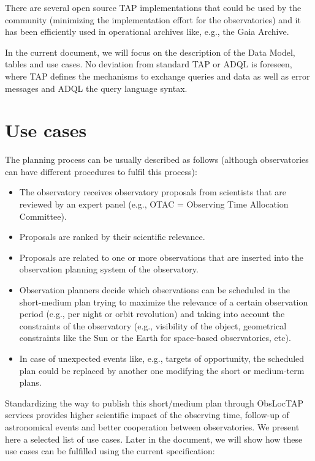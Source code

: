 \documentclass[11pt,a4paper]{ivoa}
\begin{document}
There are several open source TAP implementations that could be used by the
community (minimizing the implementation effort for the observatories) and it
has been efficiently used in operational archives like, e.g., the Gaia Archive.

In the current document, we will focus on
the description of the Data Model, tables
and use cases. No deviation from standard TAP or ADQL is foreseen, where TAP
defines the mechanisms to exchange queries and data as well as error messages
and ADQL the query language syntax.

\section{Use cases}
The planning process can be usually described as follows (although observatories
can have different procedures to fulfil this process):

\begin{itemize}
	\item{The observatory receives observatory proposals from scientists that are
  reviewed by an expert panel (e.g., OTAC = Observing Time Allocation
  Committee).}

	\item{Proposals are ranked by their scientific relevance.}

	\item{Proposals are related to one or more observations that are inserted
  into the observation planning system of the observatory.}

	\item{Observation planners decide which observations can be scheduled in the
  short-medium plan trying to maximize the relevance of a certain observation
  period (e.g., per night or orbit revolution) and taking into account the
  constraints of the observatory (e.g., visibility of the object, geometrical
  constraints like the Sun or the Earth for space-based observatories, etc).}

	\item{In case of unexpected events like, e.g., targets of opportunity, the
  scheduled plan could be replaced by another one modifying the short or
  medium-term plans.}

\end{itemize}

Standardizing the way to publish this short/medium plan through ObsLocTAP
services provides higher scientific impact of the observing time, follow-up of
astronomical events and better cooperation between observatories. We present
here a selected list of use cases. Later in the document, we will show how
these use cases can be fulfilled using the current specification:
\end{document}
